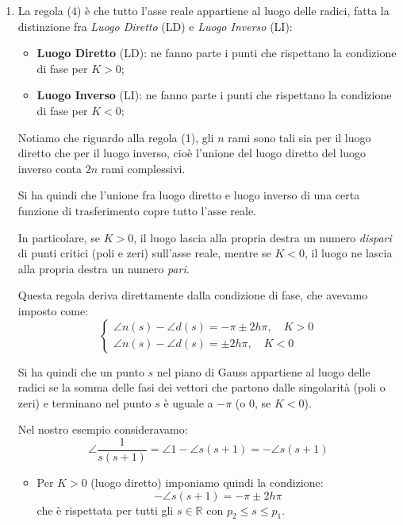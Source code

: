 \documentclass[a4paper,11pt]{article}
\begin{document}
\begin{enumerate}
	\item
		La regola (4) è che tutto l'asse reale appartiene al luogo delle radici, fatta la distinzione fra \textit{Luogo Diretto} (LD) e \textit{Luogo Inverso} (LI):
		\begin{itemize}
			\item \textbf{Luogo Diretto} (LD): ne fanno parte i punti che rispettano la condizione di fase per $K > 0$; 
			\item \textbf{Luogo Inverso} (LI): ne fanno parte i punti che rispettano la condizione di fase per $K < 0$; 
		\end{itemize}
		Notiamo che riguardo alla regola (1), gli $n$ rami sono tali sia per il luogo diretto che per il luogo inverso, cioè l'unione del luogo diretto del luogo inverso conta $2n$ rami complessivi.

		Si ha quindi che l'unione fra luogo diretto e luogo inverso di una certa funzione di trasferimento copre tutto l'asse reale.

		In particolare, se $K > 0$, il luogo lascia alla propria destra un numero \textit{dispari} di punti critici (poli e zeri) sull'asse reale, mentre se $K < 0$, il luogo ne lascia alla propria destra un numero \textit{pari}.

		Questa regola deriva direttamente dalla condizione di fase, che avevamo imposto come:
		\[
			\begin{cases}
				\angle n(s) - \angle d(s) = -\pi \pm 2 h \pi, \quad K > 0 \\
				\angle n(s) - \angle d(s) = \pm 2 h \pi, \quad K < 0
			\end{cases}
		\]

		Si ha quindi che un punto $s$ nel piano di Gauss appartiene al luogo delle radici se la somma delle fasi dei vettori che partono dalle singolarità (poli o zeri) e terminano nel punto $s$ è uguale a $-\pi$ (o 0, se $K < 0$).

		\par\medskip
		\noindent
		\textbf{}

		Nel nostro esempio consideravamo: 
		$$
		\angle \frac{1}{s(s + 1)} = \angle 1 - \angle s(s + 1) = -\angle s (s + 1)
		$$
		\begin{itemize}
			\item Per $K > 0$ (luogo diretto) imponiamo quindi la condizione:
				$$
				-\angle s (s + 1) = -\pi \pm 2 h \pi
				$$
				che è rispettata per tutti gli $s \in \mathbb{R}$ con $p_2  \leq s \leq p_1$.

				\newpage


\end{itemize}
\end{enumerate}
\end{document}
